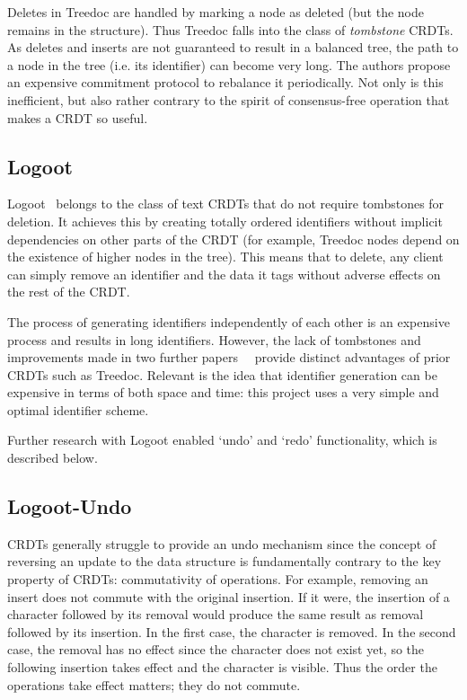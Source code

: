\documentclass[12pt,a4paper,twoside,openright]{report}
\begin{document}
Deletes in Treedoc are handled by marking a node as deleted (but the node remains in the structure). Thus Treedoc falls into the class of \textit{tombstone} CRDTs. As deletes and inserts are not guaranteed to result in a balanced tree, the path to a node in the tree (i.e. its identifier) can become very long. The authors propose an expensive commitment protocol to rebalance it periodically. Not only is this inefficient, but also rather contrary to the spirit of consensus-free operation that makes a CRDT so useful.

\subsection{Logoot} \label{sec:logoot}

Logoot~\cite{weiss2008} belongs to the class of text CRDTs that do not require tombstones for deletion. It achieves this by creating totally ordered identifiers without implicit dependencies on other parts of the CRDT (for example, Treedoc nodes depend on the existence of higher nodes in the tree). This means that to delete, any client can simply remove an identifier and the data it tags without adverse effects on the rest of the CRDT.

The process of generating identifiers independently of each other is an expensive process and results in long identifiers. However, the lack of tombstones and improvements made in two further papers~\cite{nedelec2013lseq}~\cite{nedelec2013} provide distinct advantages of prior CRDTs such as Treedoc. Relevant is the idea that identifier generation can be expensive in terms of both space and time: this project uses a very simple and optimal identifier scheme.

Further research with Logoot enabled `undo' and `redo' functionality, which is described below.


\subsection{Logoot-Undo} \label{sec:logootundo}

CRDTs generally struggle to provide an undo mechanism since the concept of reversing an update to the data structure is fundamentally contrary to the key property of CRDTs: commutativity of operations. For example, removing an insert does not commute with the original insertion. If it were, the insertion of a character followed by its removal would produce the same result as removal followed by its insertion. In the first case, the character is removed. In the second case, the removal has no effect since the character does not exist yet, so the following insertion takes effect and the character is visible. Thus the order the operations take effect matters; they do not commute.
\end{document}
